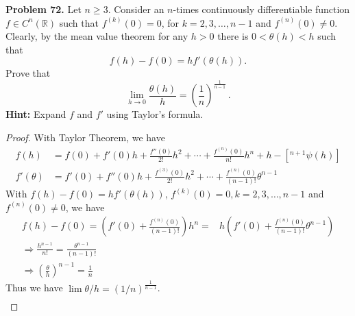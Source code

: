 \documentclass[12pt,leqno]{amsart}
\begin{document}
\noindent
{\bf Problem 72.}
Let $n\geq 3$. Consider an $n$-times continuously differentiable function $f\in C^n(\mathbb{R})$ such that
$f^{(k)}(0)=0$,  for $k=2,3,\dots,n-1$ and $f^{(n)}(0)\neq 0$.
Clearly, by the mean value theorem for any $h>0$ there is $0<\theta(h)<h$ such that
$$
f(h)-f(0)=hf'(\theta(h)).
$$
Prove that
$$
\lim_{h\to 0}\frac{\theta(h)}{h}=\left(\frac{1}{n}\right)^{\frac{1}{n-1}}\, .
$$
{\bf Hint:}  Expand $f$ and $f'$ using Taylor's formula.
\begin{proof}
With Taylor Theorem, we have
\begin{align*}
    f(h) & = f(0) + f'(0)h + \frac{f''(0)}{2!}h^2 + \cdots + \frac{f^{(n)}(0)}{n!}h^n + h-[^{n+1}\psi(h)] \\
    f'(\theta) & = f'(0) + f''(0)h + \frac{f^{(3)}(0)}{2!}h^2 + \cdots + \frac{f^{(n)}(0)}{(n-1)!}\theta^{n-1}
\end{align*}
With $f(h)-f(0)=hf'(\theta(h))$, $f^{(k)}(0)=0,k=2,3,\dots,n-1$ and $f^{(n)}(0)\neq 0$, we have 
\begin{align*}
    f(h) - f(0) = \left(f'(0)+\frac{f^{(n)}(0)}{(n-1)!}\right)h^n = &  h \left(f'(0)+\frac{f^{(n)}(0)}{(n-1)!}\theta^{n-1}\right) \\
    \Rightarrow \frac{h^{n-1}}{n!} = \frac{\theta^{n-1}}{(n-1)!} & \\
    \Rightarrow \left(\frac{\theta}{h} \right)^{n-1} = \frac{1}{n}
\end{align*}
Thus we have $\lim \theta/h = \left(1/n\right)^{\frac{1}{n-1}}$.
\begin{align*}
    
\end{align*}
\end{proof}

\medskip
\end{document}
